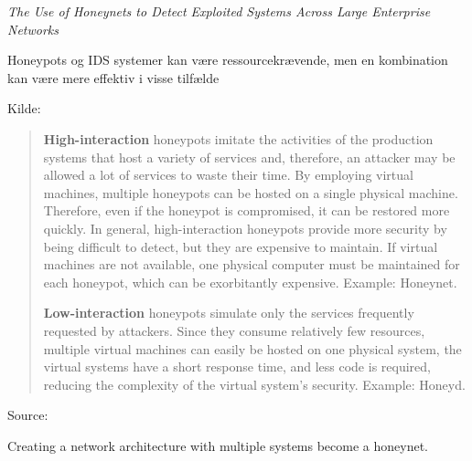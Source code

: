 \documentclass[Screen16to9,17pt]{foils}
\begin{document}
\begin{list1}
\item \emph{The Use of Honeynets to Detect Exploited Systems
Across Large Enterprise Networks}
\item Honeypots og IDS systemer kan være ressourcekrævende, men
en kombination kan være mere effektiv i visse tilfælde
\item Kilde: {\small
{}}
\end{list1}




\begin{quote}
{\bf High-interaction} honeypots imitate the activities of the production systems that host a variety of services and, therefore, an attacker may be allowed a lot of services to waste their time. By employing virtual machines, multiple honeypots can be hosted on a single physical machine. Therefore, even if the honeypot is compromised, it can be restored more quickly. In general, high-interaction honeypots provide more security by being difficult to detect, but they are expensive to maintain. If virtual machines are not available, one physical computer must be maintained for each honeypot, which can be exorbitantly expensive. Example: Honeynet.

{\bf Low-interaction} honeypots simulate only the services frequently requested by attackers. Since they consume relatively few resources, multiple virtual machines can easily be hosted on one physical system, the virtual systems have a short response time, and less code is required, reducing the complexity of the virtual system's security. Example: Honeyd.
\end{quote}

Source:



Creating a network architecture with multiple systems become a honeynet.
\end{document}
